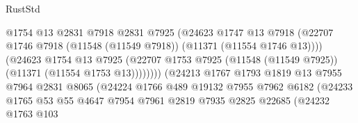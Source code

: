 \begin{lexlean}{RustStd}
\begin{coremodule}
                                          @1754
                                          @13
                                          @2831
                                          @7918
                                          @2831
                                          @7925
                                          (@24623
                                            @1747
                                            @13
                                            @7918
                                            (@22707
                                              @1746
                                              @7918
                                              (@11548 (@11549 @7918))
                                              (@11371 (@11554 @1746 @13))))
                                          (@24623
                                            @1754
                                            @13
                                            @7925
                                            (@22707
                                              @1753
                                              @7925
                                              (@11548 (@11549 @7925))
                                              (@11371 (@11554 @1753 @13))))))))
                                  (@24213
                                    @1767
                                    @1793
                                    @1819
                                    @13
                                    @7955
                                    @7964
                                    @2831
                                    @8065
                                    (@24224
                                      @1766
                                      @489
                                      @19132
                                      @7955
                                      @7962
                                      @6182
                                      (@24233
                                        @1765
                                        @53
                                        @55
                                        @4647
                                        @7954
                                        @7961
                                        @2819
                                        @7935
                                        @2825
                                        @22685
                                        (@24232
                                          @1763
                                          @103

\end{coremodule}
\end{lexlean}
